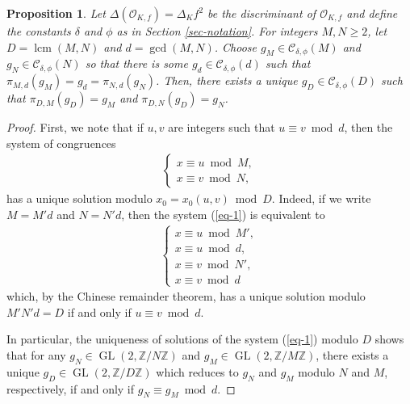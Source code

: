 \documentclass[11pt]{amsart}
\newtheorem{proposition}[defn]{Proposition}
\theoremstyle{definition}
\newcommand{\Z}{\mathbb{Z}}
\newcommand{\Of}{\mathcal{O}_{K,f}}
\newcommand{\GL}{\operatorname{GL}}
\newcommand{\lcm}{\operatorname{lcm}}
\begin{document}
\begin{proposition}\label{prop-normalizerCRT}
    Let $\Delta(\Of)=\Delta_K f^2$ be the discriminant of $\Of$ and define the constants $\delta$ and $\phi$ as in Section \ref{sec-notation}. For integers $M, N \geq 2$, let $D = \lcm(M,N)$ and $d = \gcd(M,N)$. Choose $g_{M} \in \mathcal{C}_{\delta, \phi}(M)$ and $g_{N} \in \mathcal{C}_{\delta, \phi}(N)$ so that there is some $g_d \in \mathcal{C}_{\delta, \phi}(d)$ such that $\pi_{M,d}(g_M) = g_d = \pi_{N,d}(g_N)$.    Then, there exists a unique $g_D \in \mathcal{C}_{\delta, \phi}(D)$ such that $\pi_{D,M}(g_D) = g_M$ and $\pi_{D,N}(g_D) = g_N$.
\end{proposition}
\begin{proof} First, we note that if $u,v$ are integers such that $u\equiv v \bmod d$, then the system of congruences 
	\begin{align}\label{eq-1} \begin{cases}
		x\equiv u \bmod M,\\
		x\equiv v \bmod N,
	\end{cases}\end{align} 
	has a unique solution modulo $x_0=x_0(u,v)\bmod D$. Indeed, if we write $M=M'd$ and $N=N'd$, then the system (\ref{eq-1}) is equivalent to 
		\begin{align}\label{eq-2} \begin{cases}
			x\equiv u \bmod M',\\
			x\equiv u \bmod d,\\
			x\equiv v \bmod N',\\
			x\equiv v \bmod d
	\end{cases}\end{align}
which, by the Chinese remainder theorem, has a unique solution modulo $M'N'd = D$ if and only if $u\equiv v \bmod d$. 

In particular, the uniqueness of solutions of the system (\ref{eq-1}) modulo $D$ shows that for any $g_N \in \GL(2, \Z/N\Z)$ and $g_M\in \GL(2, \Z/M\Z)$, there exists a unique $g_D \in \GL(2,\Z/D\Z)$ which reduces to $g_N$ and $g_M$ modulo $N$ and $M$, respectively, if and only if $g_N\equiv g_M \bmod d$.


\end{proof}
\end{document}
